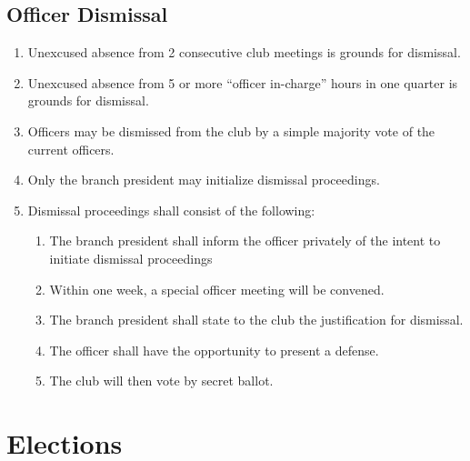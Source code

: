 \documentclass{article}
\begin{document}
\subsection{Officer Dismissal}
\begin{enumerate}
\item Unexcused absence from 2 consecutive club meetings is grounds for dismissal.
\item Unexcused absence from 5 or more ``officer in-charge'' hours in one quarter is grounds for dismissal.
\item Officers may be dismissed from the club by a simple majority vote of the current officers.
\item Only the branch president may initialize dismissal proceedings.
\item Dismissal proceedings shall consist of the following:
  \begin{enumerate}
    \item The branch president shall inform the officer privately of the intent to initiate dismissal proceedings
    \item Within one week, a special officer meeting will be convened.
    \item The branch president shall state to the club the justification for dismissal.
    \item The officer shall have the opportunity to present a defense.
    \item The club will then vote by secret ballot.
  \end{enumerate}
\end{enumerate}

\section{Elections}
\end{document}
